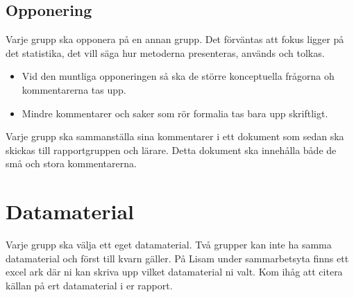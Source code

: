 \documentclass[a4paper]{article}
\begin{document}
\subsection*{Opponering}
Varje grupp ska opponera på en annan grupp. Det förväntas att fokus ligger på det statistika, det vill säga hur metoderna presenteras, används och tolkas.
\begin{itemize}
    \item Vid den muntliga opponeringen så ska de större konceptuella frågorna oh kommentarerna tas upp.
    \item Mindre kommentarer och saker som rör formalia tas bara upp skriftligt.
\end{itemize}
Varje grupp ska sammanställa sina kommentarer i ett dokument som sedan ska skickas till rapportgruppen och lärare. Detta dokument ska innehålla både de små och stora kommentarerna.

\section{Datamaterial} \label{sec:data}
Varje grupp ska välja ett eget datamaterial. Två grupper kan inte ha samma datamaterial och först till kvarn gäller. På Lisam under sammarbetsyta finns ett excel ark där ni kan skriva upp vilket datamaterial ni valt. Kom ihåg att citera källan på ert datamaterial i er rapport.
\end{document}
